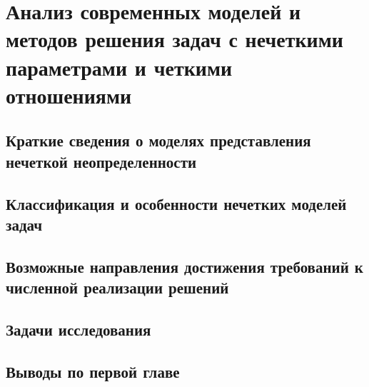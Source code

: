 \chapter{Анализ современных моделей и методов решения задач с нечеткими параметрами и четкими отношениями}
\label{chapter1}

\section{Краткие сведения о моделях представления нечеткой неопределенности}
\label{chapter1_1}


\section{Классификация и особенности нечетких моделей задач} 
\label{chapter1_2}


\section{Возможные направления достижения требований к численной реализации решений} 
\label{chapter1_3}


\section{Задачи исследования} 
\label{chapter1_4}


\section{Выводы по первой главе}
\label{chapter1_5}
